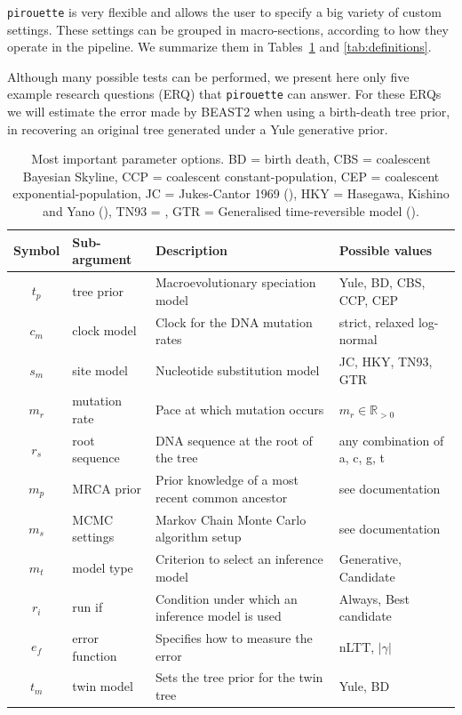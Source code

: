 \documentclass{article}
\begin{document}
\verb;pirouette; is very flexible and allows the user 
to specify a big variety of custom settings. 
These settings can be grouped in macro-sections, 
according to how they operate in the pipeline. 
We summarize them in Tables~\ref{tab:options} and \ref{tab:definitions}.

Although many possible tests can be performed, 
we present here only five example research questions (ERQ) that \verb;pirouette; can answer. 
For these ERQs we will estimate the error made by BEAST2 when 
using a birth-death tree prior, in recovering an original tree 
generated under a Yule generative prior.



\begin{table}
\centering
  \begin{tabular}{|@{}c|p{2.5cm}|p{9cm}|p{4.5cm}@{}|}
    \hline
    \centering
    \textbf{Symbol} & \textbf{Sub-argument} & \textbf{Description} & \textbf{Possible values} \\ 
    \hline
    $\mathit{t_{p}}$ & tree prior & Macroevolutionary speciation model & Yule, BD, CBS, CCP, CEP \\
    $\mathit{c_{m}}$ & clock model & Clock for the DNA mutation rates & strict, relaxed log-normal \\
    $\mathit{s_{m}}$ & site model & Nucleotide substitution model & JC, HKY, TN93, GTR \\
    $\mathit{m_{r}}$ & mutation rate & Pace at which mutation occurs & $m_{r} \in \mathbb{R}_{>0}$\\
    $\mathit{r_{s}}$ & root sequence & DNA sequence at the root of the tree & any combination of a, c, g, t \\
    $\mathit{m_{p}}$ & MRCA prior & Prior knowledge of a most recent common ancestor & see documentation \\
    $\mathit{m_{s}}$ & MCMC settings & Markov Chain Monte Carlo algorithm setup & see documentation \\
    $\mathit{m_{t}}$ & model type & Criterion to select an inference model & Generative, Candidate \\
    $\mathit{r_{i}}$ & run if & Condition under which an inference model is used & Always, Best candidate\\
    $\mathit{e_{f}}$ & error function & Specifies how to measure the error & nLTT, $|\gamma|$ \\
    $\mathit{t_{m}}$ & twin model & Sets the tree prior for the twin tree & Yule, BD \\
    \hline
  \end{tabular}
  \caption{
    Most important parameter options. BD = birth death, CBS = coalescent
    Bayesian Skyline, CCP = coalescent constant-population, CEP = coalescent
    exponential-population, JC = Jukes-Cantor 1969 (\cite{jukes1969evolution}), HKY = Hasegawa, Kishino and 
    Yano (\cite{hasegawa1985dating}), TN93 = \cite{tamura1993estimation}, GTR = Generalised time-reversible 
    model (\cite{tavare1986some}).
  }
  \label{tab:options}
\bigskip


\end{table}
\end{document}
